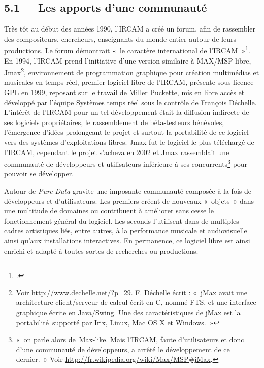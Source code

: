 \documentclass{FramateX}
\begin{document}
\begin{refsection}
\subsection*{5.1~~~Les apports d'une communauté}
{}

Très tôt au début des années 1990, l'IRCAM a créé un forum, afin de
rassembler des compositeurs, chercheurs, enseignants du monde entier
autour de leurs productions. Le forum démontrait «~le caractère
international de l'IRCAM~»\footnote{\cite[p.~543]{Dufrene2007}.}. En 1994,
l'IRCAM prend l'initiative d'une version similaire à MAX/MSP libre,
Jmax\footnote{Voir \url{http://www.dechelle.net/?p=29}. F. Déchelle écrit : «~jMax avait une
architecture client/serveur de calcul écrit en C, nommé FTS, et une
interface graphique écrite en Java/Swing. Une des caractéristiques de
jMax est la portabilité~supporté par Irix, Linux, Mac OS X et
Windows.~»}, environnement de programmation graphique pour création
multimédias et musicales en temps réel, premier logiciel libre de
l'IRCAM, présente sous licence GPL en 1999, reposant sur le travail de
Miller Puckette, mis en libre accès et développé par l'équipe Systèmes
temps réel sous le contrôle de François
Déchelle. L'intérêt de
l'IRCAM pour un tel développement était la diffusion indirecte de ses
logiciels propriétaires, le rassemblement de béta-testeurs bénévoles,
l'émergence d'idées prolongeant le projet et surtout la portabilité de
ce logiciel vers des systèmes d'exploitations libres. Jmax fut le
logiciel le plus téléchargé de l'IRCAM, cependant le projet s'acheva en
2002 et Jmax rassemblait une communauté de développeurs et utilisateurs
inférieure à ses concurrents\footnote{«~on parle alors de~Max-like.
Mais l'IRCAM, faute d'utilisateurs et
donc d'une communauté de développeurs, a arrêté le
développement de ce dernier.~» Voir \url{http://fr.wikipedia.org/wiki/Max/MSP\#jMax}.} pour pouvoir se développer.


Autour de \textit{Pure Data} gravite une imposante communauté composée à la fois
de développeurs et d'utilisateurs. Les premiers créent
de nouveaux «~objets~» dans une multitude de domaines ou contribuent à
améliorer sans cesse le fonctionnement général du logiciel. Les seconds
l'utilisent dans de multiples cadres artistiques liés,
entre autres, à la performance musicale et audiovisuelle ainsi
qu'aux installations interactives. En permanence, ce
logiciel libre est ainsi enrichi et adapté à toutes sortes de
recherches ou productions. 


\end{refsection}
\end{document}
